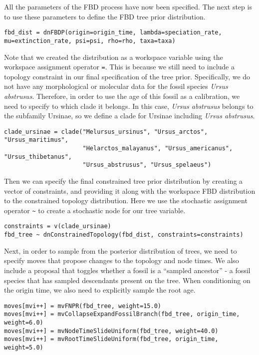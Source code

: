 All the parameters of the FBD process have now been specified. 
The next step is to use these parameters to define the FBD tree prior distribution.

{\tt \begin{snugshade*}
\begin{lstlisting}
fbd_dist = dnFBDP(origin=origin_time, lambda=speciation_rate, mu=extinction_rate, psi=psi, rho=rho, taxa=taxa)
\end{lstlisting}
\end{snugshade*}}

Note that we created the distribution as a workspace variable using the workspace assignment operator \verb+=+.
This is because we still need to include a topology constraint in our final specification of the tree prior.
Specifically, we do not have any morphological or molecular data for the fossil species \textit{Ursus abstrusus}.
Therefore, in order to use the age of this fossil as a calibration, we need to specify to which clade it belongs.
In this case, \textit{Ursus abstrusus} belongs to the subfamily Ursinae, so we define a clade for Ursinae including \textit{Ursus abstrusus}.

{\tt \begin{snugshade*}
\begin{lstlisting}
clade_ursinae = clade("Melursus_ursinus", "Ursus_arctos", "Ursus_maritimus", 
                      "Helarctos_malayanus", "Ursus_americanus", "Ursus_thibetanus", 
                      "Ursus_abstrusus", "Ursus_spelaeus")
\end{lstlisting}
\end{snugshade*}}

Then we can specify the final constrained tree prior distribution by creating a vector of constraints, and providing it along with the workspace FBD distribution to the constrained topology distribution.
Here we use the stochastic assignment operator \verb+~+ to create a stochastic node for our tree variable. 

{\tt \begin{snugshade*}
\begin{lstlisting}
constraints = v(clade_ursinae)
fbd_tree ~ dnConstrainedTopology(fbd_dist, constraints=constraints)
\end{lstlisting}
\end{snugshade*}}

Next, in order to sample from the posterior distribution of trees, we need to specify moves that propose changes to the  topology and node times.
We also include a proposal that toggles whether a fossil is a ``sampled ancestor'' - a fossil species that has sampled descendants present on the tree.
When conditioning on the origin time, we also need to explicitly sample the root age.
{\tt \begin{snugshade*}
\begin{lstlisting}
moves[mvi++] = mvFNPR(fbd_tree, weight=15.0)
moves[mvi++] = mvCollapseExpandFossilBranch(fbd_tree, origin_time, weight=6.0)
moves[mvi++] = mvNodeTimeSlideUniform(fbd_tree, weight=40.0)
moves[mvi++] = mvRootTimeSlideUniform(fbd_tree, origin_time, weight=5.0)
\end{lstlisting}
\end{snugshade*}}

